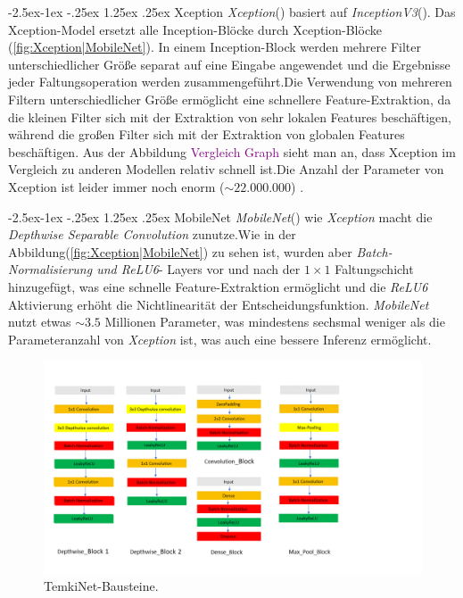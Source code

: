 \documentclass[12pt,a4paper]{scrartcl}
\makeatletter
\numberwithin{equation}{section}
\renewcommand\paragraph{\@startsection{paragraph}{4}{\z@}%
	{-2.5ex\@plus -1ex \@minus -.25ex}%
	{1.25ex \@plus .25ex}%
	{\normalfont\normalsize\bfseries}}
\makeatother
\begin{document}
\paragraph{Xception}\label{Xception}
\textit{Xception}(\cite{Xception}) basiert auf  \textit{InceptionV3}(\cite{InceptionV3}). 
Das Xception-Model ersetzt alle Inception-Blöcke durch Xception-Blöcke (\ref{fig:Xception|MobileNet}). In einem Inception-Block werden mehrere Filter unterschiedlicher Größe separat auf eine Eingabe angewendet und die Ergebnisse jeder Faltungsoperation werden zusammengeführt.Die Verwendung von mehreren Filtern unterschiedlicher Größe ermöglicht eine schnellere Feature-Extraktion, da die kleinen Filter sich mit der Extraktion von sehr lokalen Features beschäftigen, während die großen Filter sich mit der Extraktion von globalen Features beschäftigen. Aus der Abbildung \textcolor{purple}{Vergleich Graph  } sieht man an, dass Xception im Vergleich zu anderen Modellen relativ schnell ist.Die Anzahl der Parameter von Xception ist leider immer noch enorm ($ \sim22.000.000 $) .

\paragraph{MobileNet}
\textit{MobileNet}(\cite{MobileNet}) wie \textit{Xception} macht die \textit{Depthwise Separable Convolution} zunutze.Wie in der Abbildung(\ref{fig:Xception|MobileNet}) zu sehen ist, wurden aber \textit{Batch-Normalisierung und ReLU6}- Layers vor und nach der $ 1\times1 $ Faltungschicht hinzugefügt, was eine schnelle Feature-Extraktion ermöglicht und die \textit{ReLU6} Aktivierung erhöht die Nichtlinearität der Entscheidungsfunktion. \textit{MobileNet} nutzt etwas $\sim 3.5$ Millionen Parameter, was mindestens sechsmal weniger als die Parameteranzahl von \textit{Xception} ist, was auch eine bessere Inferenz ermöglicht.


\begin{figure}[h!]
\centering
\includegraphics[width=\textwidth ]{Convolution/Folie4}
\caption{TemkiNet-Bausteine.}
\label{fig:TEMKENG_NET}
\end{figure}
\end{document}
